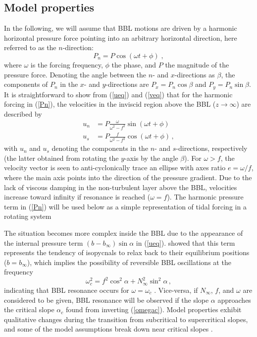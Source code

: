 \subsection{Model properties}\label{modelproperties}
In the following, we will assume that BBL motions are driven by a
harmonic horizontal pressure force pointing into an arbitrary
horizontal direction, here referred to as the $n$-direction:
\begin{equation}
  \label{Pn}
  P_n = P \cos (\omega t + \phi) \; ,
\end{equation}
where $\omega$ is the forcing frequency, $\phi$ the phase, and $P$ the
magnitude of the pressure force. Denoting the angle between the $n$-
and $x$-directions as $\beta$, the components of $P_n$ in the $x$- and
$y$-directions are $P_x = P_n \cos \beta$ and $P_y = P_n \sin
\beta$. It is straightforward to show from (\ref{ueq}) and (\ref{veq})
that for the harmonic forcing in (\ref{Pn}), the velocities in the
inviscid region above the BBL ($z\rightarrow \infty$) are described by
\begin{align}
  \label{Un}
  u_n & = P \frac{\omega}{\omega^2 - f^2} \sin ( \omega t + \phi) \\
  u_s & = P \frac{f     }{\omega^2 - f^2} \cos ( \omega t + \phi) \, ,
  \label{Us}
\end{align}
with $u_n$ and $u_s$ denoting the components in the $n$- and
$s$-directions, respectively (the latter obtained from rotating the
$y$-axis by the angle $\beta$). For $\omega>f$, the velocity vector is
seen to anti-cyclonically trace an ellipse with axes ratio
$e=\omega/f$, where the main axis points into the direction of the
pressure gradient. Due to the lack of viscous damping in the
non-turbulent layer above the BBL, velocities increase toward infinity
if resonance is reached ($\omega=f$). The harmonic pressure term in
(\ref{Pn}) will be used below as a simple representation of tidal
forcing in a rotating system

The situation becomes more complex inside the BBL due to the
appearance of the internal pressure term $(b-b_\infty) \sin \alpha$ in
(\ref{ueq}). \cite{Umlaufetal2015a} showed that this term represents
the tendency of isopycnals to relax back to their equilibrium
positions ($b=b_\infty$), which implies the possibility of reversible
BBL oscillations at the frequency
\begin{equation}
  \label{omegac}
  \omega_c^2 = f^2 \cos^2 \alpha + N_\infty^2 \sin^2 \alpha \, ,
\end{equation}
indicating that BBL resonance occurs for $\omega=\omega_c$
\citep{UmlaufBurchard2011a}. Vice-versa, if $N_\infty$, $f$, and
$\omega$ are considered to be given, BBL resonance will be observed if
the slope $\alpha$ approaches the critical slope $\alpha_c$ found from
inverting (\ref{omegac}). Model properties exhibit qualitative changes
during the transition from subcritical to supercritical slopes, and
some of the model assumptions break down near critical slopes
\citep{UmlaufBurchard2011a,schulzumlauf2016}.

